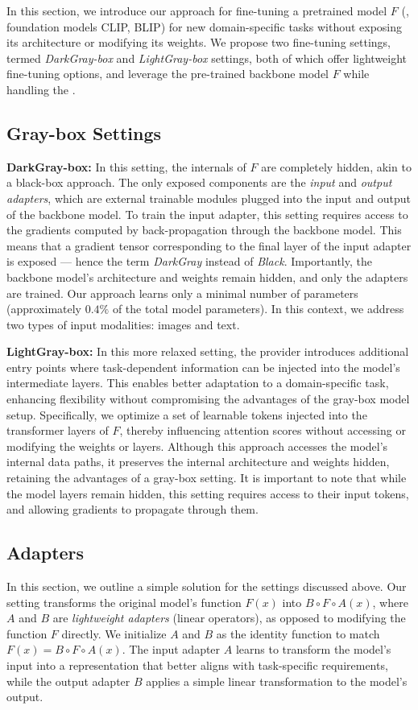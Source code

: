In this section, we introduce our approach for fine-tuning a pretrained model $F$ (\eg, foundation models CLIP, BLIP) for new domain-specific tasks without exposing its architecture or modifying its weights. We propose two fine-tuning settings, termed \emph{DarkGray-box} and \emph{LightGray-box} settings, both of which offer lightweight fine-tuning options, and leverage the pre-trained backbone model $F$ while handling the \WB.

\subsection{Gray-box Settings}

\textbf{DarkGray-box:} In this setting, the internals of $F$ are completely hidden, akin to a black-box approach. The only exposed components are the \emph{input} and \emph{output adapters}, which are external trainable modules plugged into the input and output of the backbone model. To train the input adapter, this setting requires access to the gradients computed by back-propagation through the backbone model. This means that a gradient tensor corresponding to the final layer of the input adapter is exposed --- hence the term \emph{DarkGray} instead of \emph{Black}. Importantly, the backbone model's architecture and weights remain hidden, and only the adapters are trained. Our approach learns only a minimal number of parameters (approximately $0.4\%$ of the total model parameters). In this context, we address two types of input modalities: images and text.

\textbf{LightGray-box:} In this more relaxed setting, the provider introduces additional entry points where task-dependent information can be injected into the model's intermediate layers. This enables better adaptation to a domain-specific task, enhancing flexibility without compromising the advantages of the gray-box model setup. Specifically, we optimize a set of learnable tokens injected into the transformer layers of $F$, thereby influencing attention scores without accessing or modifying the weights or layers. Although this approach accesses the model's internal data paths, it preserves the internal architecture and weights hidden, retaining the advantages of a gray-box setting. It is important to note that while the model layers remain hidden, this setting requires access to their input tokens, and allowing gradients to propagate through them.

\subsection{Adapters}
In this section, we outline a simple solution for the settings discussed above.
Our \oursFull setting transforms the original model's function $F(x)$ into $B\circ F\circ A (x)$, where $A$ and $B$ are \emph{lightweight adapters} (linear operators), as opposed to modifying the function $F$ directly. We initialize $A$ and $B$ as the identity function to match $F(x)=B\circ F\circ A (x)$. The input adapter $A$ learns to transform the model's input into a representation that better aligns with task-specific requirements, while the output adapter $B$ applies a simple linear transformation to the model's output.

